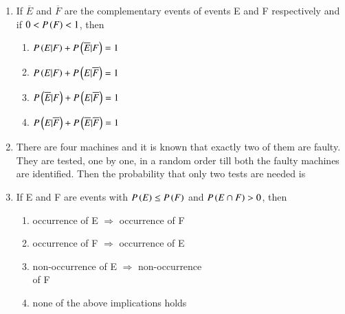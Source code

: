 \documentclass[journal,12pt,twocolumn,article]{IEEEtran}
\theoremstyle{remark}
\begin{document}
\begin{enumerate}[start = 3]
\hfill{}
\begin{enumerate}
\end{enumerate}
\item If $\overline{E}$ and $\overline{F}$ are the complementary events of events E and F respectively and if $0<P\left(F\right)<1$, then
\hfill{}
\begin{enumerate}
\item $P\left(E|F\right)+P\left(\overline{E}|F\right)=1$
\item $P\left(E|F\right)+P\left(E|\overline{F}\right)=1$
\item $P\left(\overline{E}|F\right)+P\left(E|\overline{F}\right)=1$
\item $P\left(E|\overline{F}\right)+P\left(\overline{E}|\overline{F}\right)=1$
\end{enumerate}
\item There are four machines and it is known that exactly two of them are faulty. They are tested, one by one, in a random order till both the faulty machines are identified. Then the probability that only two tests are needed is
\hfill{}
\begin{enumerate}
\end{enumerate}
\item If E and F are events with $P\left(E\right) \leq P\left(F\right)$ and $P\left(E\cap F\right)>0$, then
\hfill{}
\begin{enumerate}
\item occurrence of E $\Rightarrow$ occurrence of F
\item occurrence of F $\Rightarrow$ occurrence of E
\item non-occurrence of E $\Rightarrow$ non-occurrence \\of F
\item none of the above implications holds

\end{enumerate}
\end{enumerate}
\end{document}
